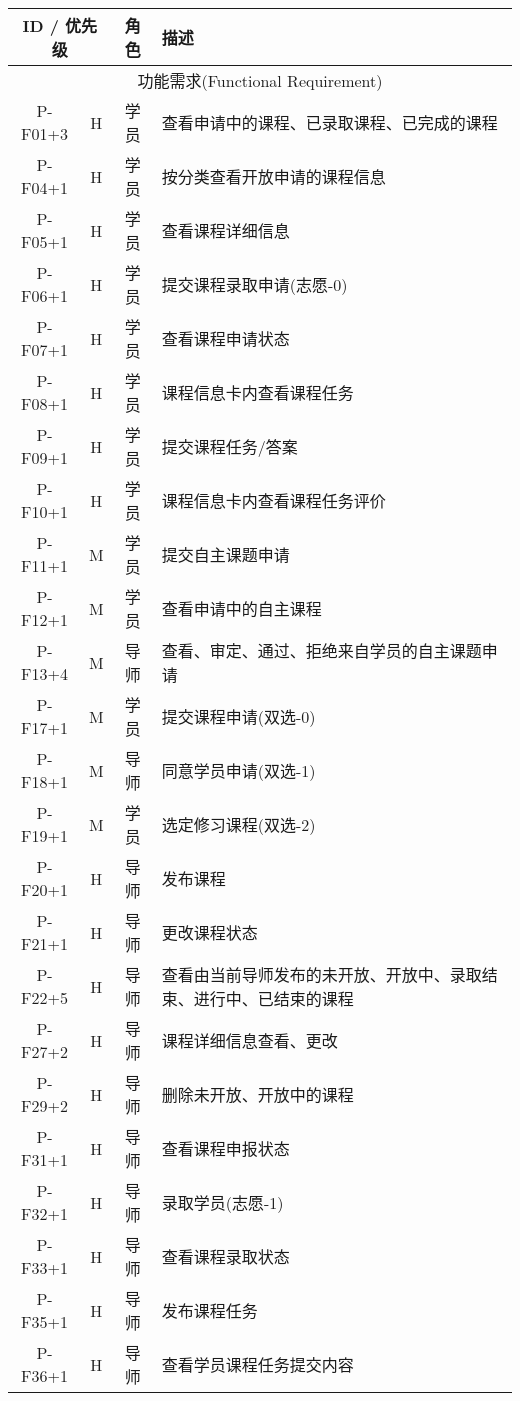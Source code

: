 
\noindent
\ttfamily
\begin{longtable}{|c|c|c|X|}
  \hline
  \multicolumn{2}{|c|}{\textbf{ID} / \textbf{优先级}} & \textbf{角色} & \textbf{描述} \\ \hline
  \multicolumn{4}{|c|}{功能需求(Functional Requirement)} \\ \hline
  P-F01+3 & H & 学员 & 查看申请中的课程、已录取课程、已完成的课程 \\ \hline
  P-F04+1 & H & 学员 & 按分类查看开放申请的课程信息 \\ \hline
  P-F05+1 & H & 学员 & 查看课程详细信息 \\ \hline
  P-F06+1 & H & 学员 & 提交课程录取申请(志愿-0) \\ \hline
  P-F07+1 & H & 学员 & 查看课程申请状态 \\ \hline
  P-F08+1 & H & 学员 & 课程信息卡内查看课程任务 \\ \hline
  P-F09+1 & H & 学员 & 提交课程任务/答案 \\ \hline
  P-F10+1 & H & 学员 & 课程信息卡内查看课程任务评价 \\ \hline
  P-F11+1 & M & 学员 & 提交自主课题申请 \\ \hline
  P-F12+1 & M & 学员 & 查看申请中的自主课程 \\ \hline
  P-F13+4 & M & 导师 & 查看、审定、通过、拒绝来自学员的自主课题申请 \\ \hline
  P-F17+1 & M & 学员 & 提交课程申请(双选-0) \\ \hline
  P-F18+1 & M & 导师 & 同意学员申请(双选-1) \\ \hline
  P-F19+1 & M & 学员 & 选定修习课程(双选-2) \\ \hline
  P-F20+1 & H & 导师 & 发布课程 \\ \hline
  P-F21+1 & H & 导师 & 更改课程状态 \\ \hline
  P-F22+5 & H & 导师 & 查看由当前导师发布的未开放、开放中、录取结束、进行中、已结束的课程 \\ \hline
  P-F27+2 & H & 导师 & 课程详细信息查看、更改 \\ \hline
  P-F29+2 & H & 导师 & 删除未开放、开放中的课程 \\ \hline
  P-F31+1 & H & 导师 & 查看课程申报状态 \\ \hline
  P-F32+1 & H & 导师 & 录取学员(志愿-1) \\ \hline
  P-F33+1 & H & 导师 & 查看课程录取状态 \\ \hline
  P-F35+1 & H & 导师 & 发布课程任务 \\ \hline
  P-F36+1 & H & 导师 & 查看学员课程任务提交内容 \\ \hline

\end{longtable}
